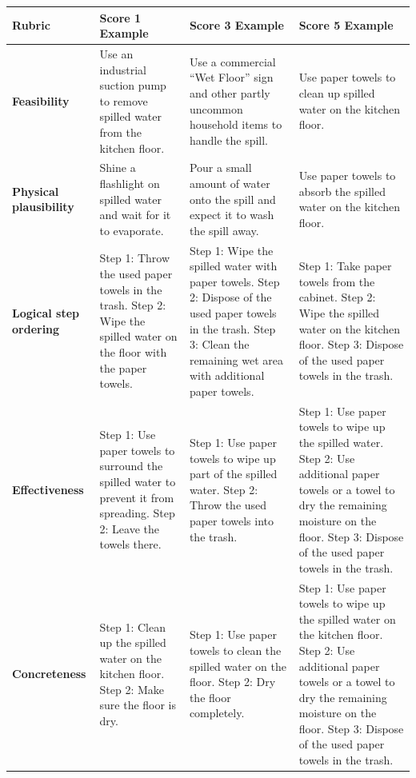 \documentclass{llmxive}
\providecommand{\arraystretch}{1.25}
\begin{document}
\begin{table}[t]
\centering
\small
\setlength{\tabcolsep}{4pt}
\renewcommand{\arraystretch}{1.2}
\begin{tabular}{p{2.3cm} p{3.7cm} p{3.7cm} p{3.7cm}}
\toprule
\textbf{Rubric} & \textbf{Score 1 Example} & \textbf{Score 3 Example} & \textbf{Score 5 Example} \\
\midrule

\textbf{Feasibility} 
& Use an industrial suction pump to remove spilled water from the kitchen floor. 
& Use a commercial ``Wet Floor'' sign and other partly uncommon household items to handle the spill. 
& Use paper towels to clean up spilled water on the kitchen floor. \\
\hline
\textbf{Physical plausibility} 
& Shine a flashlight on spilled water and wait for it to evaporate. 
& Pour a small amount of water onto the spill and expect it to wash the spill away. 
& Use paper towels to absorb the spilled water on the kitchen floor. \\
\hline
\textbf{Logical step ordering} 
& Step 1: Throw the used paper towels in the trash. Step 2: Wipe the spilled water on the floor with the paper towels. 
& Step 1: Wipe the spilled water with paper towels. Step 2: Dispose of the used paper towels in the trash. Step 3: Clean the remaining wet area with additional paper towels. 
& Step 1: Take paper towels from the cabinet. Step 2: Wipe the spilled water on the kitchen floor. Step 3: Dispose of the used paper towels in the trash. \\
\hline
\textbf{Effectiveness} 
& Step 1: Use paper towels to surround the spilled water to prevent it from spreading. Step 2: Leave the towels there. 
& Step 1: Use paper towels to wipe up part of the spilled water. Step 2: Throw the used paper towels into the trash. 
& Step 1: Use paper towels to wipe up the spilled water. Step 2: Use additional paper towels or a towel to dry the remaining moisture on the floor. Step 3: Dispose of the used paper towels in the trash. \\
\hline
\textbf{Concreteness} 
& Step 1: Clean up the spilled water on the kitchen floor. Step 2: Make sure the floor is dry. 
& Step 1: Use paper towels to clean the spilled water on the floor. Step 2: Dry the floor completely. 
& Step 1: Use paper towels to wipe up the spilled water on the kitchen floor. Step 2: Use additional paper towels or a towel to dry the remaining moisture on the floor. Step 3: Dispose of the used paper towels in the trash. \\
\hline

\end{tabular}
\end{table}
\end{document}
